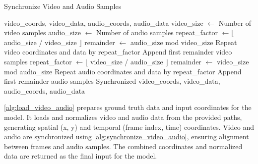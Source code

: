 \documentclass{ioereport}
\begin{document}
\begin{algorithm}
    \caption{Synchronize Video and Audio Samples}
    \label{alg:synchronize_video_audio}
    \begin{algorithmic}[1]
    \REQUIRE video\_coords, video\_data, audio\_coords, audio\_data
    \STATE video\_size $\gets$ Number of video samples
    \STATE audio\_size $\gets$ Number of audio samples
        \STATE repeat\_factor $\gets \lfloor$ audio\_size / video\_size $\rfloor$
        \STATE remainder $\gets$ audio\_size mod video\_size
        \STATE Repeat video coordinates and data by repeat\_factor
            \STATE Append first remainder video samples
        \ENDIF
        \STATE repeat\_factor $\gets \lfloor$ video\_size / audio\_size $\rfloor$
        \STATE remainder $\gets$ video\_size mod audio\_size
        \STATE Repeat audio coordinates and data by repeat\_factor
            \STATE Append first remainder audio samples
        \ENDIF
    \ENDIF
    \RETURN Synchronized video\_coords, video\_data, audio\_coords, audio\_data
    \end{algorithmic}
\end{algorithm}

\autoref{alg:load_video_audio} prepares ground truth data and input coordinates for the model. It loads and normalizes video and audio data from the provided paths, generating spatial (x, y) and temporal (frame index, time) coordinates. Video and audio are synchronized using \autoref{alg:synchronize_video_audio}, ensuring alignment between frames and audio samples. The combined coordinates and normalized data are returned as the final input for the model.
\end{document}

